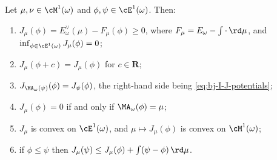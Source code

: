 \begin{proposition}
\label{prop:ch48-defect-elementary}
Let $\mu,\nu\in\cM^1(\omega)$ and $\phi,\psi\in\cE^1(\omega)$.  Then:
\begin{enumerate}
\item\label{itm:ch48-def:nonneg}
      $J_\mu(\phi)=E^\vee_\omega(\mu)-F_\mu(\phi)\ge0$, where
      $F_\mu=E_\omega-\int\cdot\,\rd\mu$, and
      $\inf_{\phi\in\cE^1(\omega)}J_\mu(\phi)=0$;
\item\label{itm:ch48-def:transl}
      $J_\mu(\phi+c)=J_\mu(\phi)$ for $c\in\mathbf R$;
\item\label{itm:ch48-def:ma}
      $J_{\MA_\omega(\psi)}(\phi)=J_\psi(\phi)$, the right-hand side
      being \eqref{eq:bj-I-J-potentials};
\item\label{itm:ch48-def:zero}
      $J_\mu(\phi)=0$ if and only if $\MA_\omega(\phi)=\mu$;
\item\label{itm:ch48-def:convex}
      $J_\mu$ is convex on $\cE^1(\omega)$, and
      $\mu\mapsto J_\mu(\phi)$ is convex on $\cM^1(\omega)$;
\item\label{itm:ch48-def:mono}
      if $\phi\le\psi$ then
      $J_\mu(\psi)\le J_\mu(\phi)+\int(\psi-\phi)\,\rd\mu$.
\end{enumerate}
\end{proposition}

